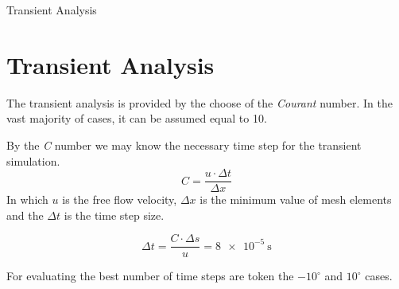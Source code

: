 \documentclass[english,10pt,a4paper,twoside]{beamer}
\begin{document}
	\begin{frame}[shrink = 25]{Transient Analysis}
		\section{Transient Analysis}
		The transient analysis is provided by the choose of the \textit{Courant} number. In the vast majority of cases, it can be assumed equal to 10. 
		
		By the \textit{C} number we may know the necessary time step for the transient simulation. 
		\[C = \dfrac{u\cdot\Delta t}{\Delta x}\]
		In which $u$ is the free flow velocity, $\Delta x$ is the minimum value of mesh elements and the $\Delta t$ is the time step size. 
		
		\[\Delta t = \dfrac{C\cdot \Delta s}{u} = \SI{8e-5}{\second}\]
		
		For evaluating the best number of time steps are token the $-10^\circ$ and $10^\circ$ cases. 


\end{frame}
\end{document}
